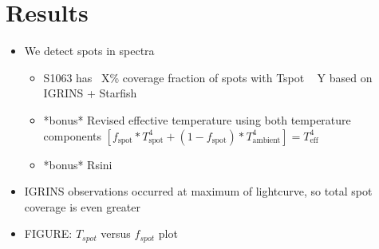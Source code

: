 \documentclass[twocolumn]{emulateapj}%
\begin{document}
\section{Results}
\begin{itemize}
\item We detect spots in spectra
\begin{itemize}
  \item S1063 has ~X\% coverage fraction of spots with Tspot ~ Y based on IGRINS + Starfish
  \item *bonus* Revised effective temperature using both temperature components $[f_{\textrm{spot}} * T_{\textrm{spot}}^4 + (1 -f_{\textrm{spot}}) * T_{\textrm{ambient}}^4] = T_{\textrm{eff}}^4$
  \item *bonus* Rsini
\end{itemize}
\item IGRINS observations occurred at maximum of lightcurve, so total spot coverage is even greater
\item FIGURE: $T_{spot}$ versus $f_{spot}$ plot



\end{itemize}
\end{document}
